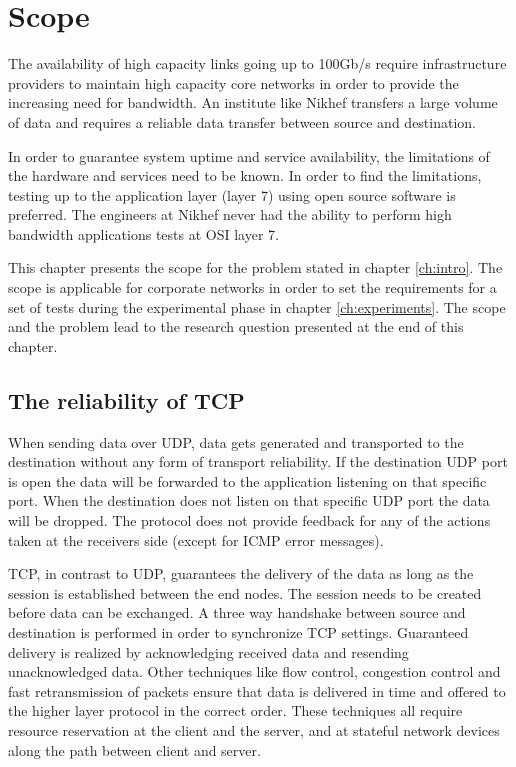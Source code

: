 \chapter{Scope}\label{ch:problem}

The availability of high capacity links going up to 100Gb/s require infrastructure providers to maintain high capacity core networks in order to provide the increasing need for bandwidth.
An institute like Nikhef transfers a large volume of data and requires a reliable data transfer between source and destination.

In order to guarantee system uptime and service availability, the limitations of the hardware and services need to be known.  
In order to find the limitations, testing up to the application layer (layer 7) using open source software is preferred. 
The engineers at Nikhef never had the ability to perform high bandwidth applications tests at OSI layer 7. 

This chapter presents the scope for the problem stated in chapter \ref{ch:intro}. 
The scope is applicable for corporate networks in order to set the requirements for a set of tests during the experimental phase in chapter \ref{ch:experiments}.  
The scope and the problem lead to the research question presented at the end of this chapter. 

\section{The reliability of TCP}\label{sec:sessionbased}
When sending data over UDP, data gets generated and transported to the destination without any form of transport reliability. 
If the destination UDP port is open the data will be forwarded to the application listening on that specific port.
When the destination does not listen on that specific UDP port the data will be dropped.
The protocol does not provide feedback for any of the actions taken at the receivers side (except for ICMP error messages).
 
TCP, in contrast to UDP, guarantees the delivery of the data as long as the session is established between the end nodes.
The session needs to be created before data can be exchanged. 
A three way handshake between source and destination is performed in order to synchronize TCP settings. 
Guaranteed delivery is realized by acknowledging received data and resending unacknowledged data. 
Other techniques like flow control, congestion control and fast retransmission of packets ensure that data is delivered in time and offered to the higher layer protocol in the correct order. 
These techniques all require resource reservation at the client and the server, and at stateful network devices along the path between client and server. 

